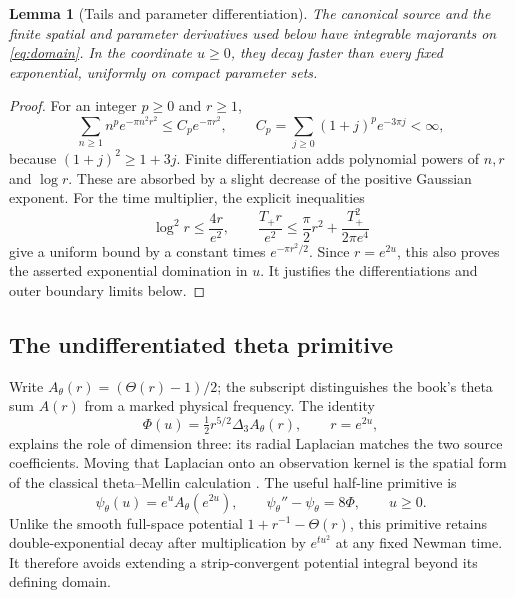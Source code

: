 \documentclass[11pt]{article}
\numberwithin{equation}{section}
\newtheorem{lemma}[theorem]{Lemma}
\begin{document}
\begin{lemma}[Tails and parameter differentiation]\label{lem:tails}
The canonical source and the finite spatial and parameter derivatives
used below have integrable majorants on \eqref{eq:domain}. In the
coordinate $u\ge0$, they decay faster than every fixed exponential,
uniformly on compact parameter sets.
\end{lemma}
\begin{proof}
For an integer $p\ge0$ and $r\ge1$,
\[
\sum_{n\ge1}n^p e^{-\pi n^2r^2}
\le C_p e^{-\pi r^2},\qquad
C_p=\sum_{j\ge0}(1+j)^p e^{-3\pi j}<\infty,
\]
because $(1+j)^2\ge1+3j$. Finite differentiation adds polynomial
powers of $n,r$ and $\log r$. These are absorbed by a slight decrease
of the positive Gaussian exponent. For the time multiplier, the explicit
inequalities
\[
\log^2r\le\frac{4r}{e^2},\qquad
\frac{T_+r}{e^2}\le\frac\pi2r^2+\frac{T_+^2}{2\pi e^4}
\]
give a uniform bound by a constant times $e^{-\pi r^2/2}$.
Since $r=e^{2u}$, this also proves the asserted exponential domination in
$u$. It justifies the differentiations and outer boundary limits below.
\end{proof}


\subsection{The undifferentiated theta primitive}\label{sec:primitive}

Write $A_\theta(r)=(\Theta(r)-1)/2$; the subscript distinguishes the
book's theta sum $A(r)$ from a marked physical frequency. The identity
\[
 \Phi(u)=\tfrac12r^{5/2}\Delta_3A_\theta(r),\qquad r=e^{2u},
\]
explains the role of dimension three: its radial Laplacian matches the
two source coefficients. Moving that Laplacian onto an observation
kernel is the spatial form of the classical theta--Mellin calculation
\cite{Riemann1859,DLMFThetaMellin}. The useful half-line primitive is
\begin{equation}\label{eq:thetaprimitive}
 \psi_\theta(u)=e^uA_\theta(e^{2u}),\qquad
 \psi_\theta''-\psi_\theta=8\Phi,\qquad u\ge0.
\end{equation}
Unlike the smooth full-space potential $1+r^{-1}-\Theta(r)$, this
primitive retains double-exponential decay after multiplication by
$e^{tu^2}$ at any fixed Newman time. It therefore avoids extending a
strip-convergent potential integral beyond its defining domain.
\end{document}
